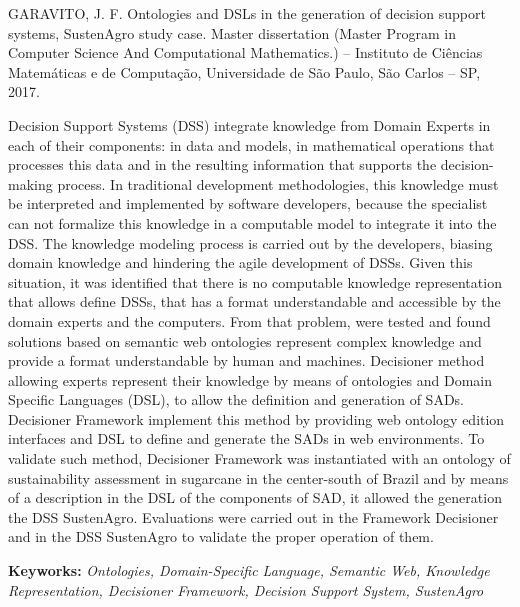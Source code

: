 %
GARAVITO, J. F. \foreignlanguage{english}{Ontologies and DSLs in the
generation of decision support systems, SustenAgro study case. Master
dissertation (Master Program in Computer Science And Computational
Mathematics.)} – Instituto de Ciências Matemáticas e de Computação,
Universidade de São Paulo, São Carlos – SP, 2017.

\vphantom{}

%
Decision Support Systems (DSS) integrate knowledge from Domain Experts
in each of their components: in data and models, in mathematical operations
that processes this data and in the resulting information that supports
the decision-making process. In traditional development methodologies,
this knowledge must be interpreted and implemented by software developers,
because the specialist can not formalize this knowledge in a computable
model to integrate it into the DSS. The knowledge modeling process
is carried out by the developers, biasing domain knowledge and hindering
the agile development of DSSs. Given this situation, it was identified
that there is no computable knowledge representation that allows define
DSSs, that has a format understandable and accessible by the domain
experts and the computers. From that problem, were tested and found
solutions based on semantic web ontologies represent complex knowledge
and provide a format understandable by human and machines. Decisioner
method allowing experts represent their knowledge by means of ontologies
and Domain Specific Languages (DSL), to allow the definition and generation
of SADs. Decisioner Framework implement this method by providing web
ontology edition interfaces and DSL to define and generate the SADs
in web environments. To validate such method, Decisioner Framework
was instantiated with an ontology of sustainability assessment in
sugarcane in the center-south of Brazil and by means of a description
in the DSL of the components of SAD, it allowed the generation the
DSS SustenAgro. Evaluations were carried out in the Framework Decisioner
and in the DSS SustenAgro to validate the proper operation of them.

%
\vphantom{}

%
\textbf{Keyworks:} \emph{Ontologies, Domain-Specific Language, Semantic
Web, Knowledge Representation, Decisioner Framework, Decision Support
System, SustenAgro }
